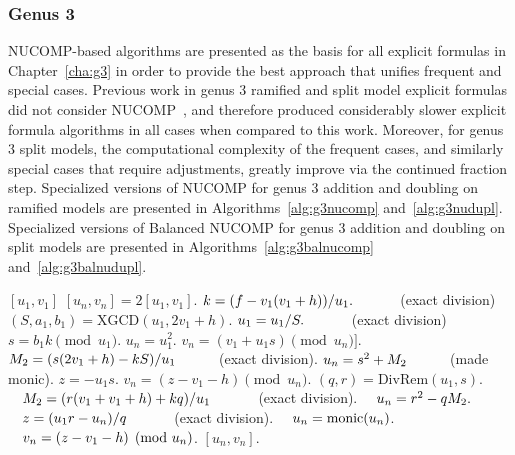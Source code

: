 \newpage


\subsubsection{Genus 3}
NUCOMP-based algorithms are presented as the basis for all explicit formulas in
Chapter~\ref{cha:g3} in order to provide the best approach that unifies frequent
and special cases. Previous work in genus 3 ramified and split model explicit
formulas did not consider
NUCOMP~\cite{fan_g3_2006,rad2019jacobian,Sutherland_g3_2019}, and therefore
produced considerably slower explicit formula algorithms in all cases when
compared to this work. Moreover, for genus 3 split models, the computational
complexity of the frequent cases, and similarly special cases that require
adjustments, greatly improve via the continued fraction step. Specialized
versions of NUCOMP for genus 3 addition and doubling on ramified models are
presented in Algorithms~\ref{alg:g3nucomp} and~\ref{alg:g3nudupl}. Specialized
versions of Balanced NUCOMP for genus 3 addition and doubling on split models
are presented in Algorithms~\ref{alg:g3balnucomp} and~\ref{alg:g3balnudupl}.


\begin{algorithm}[htbp]
\caption{Genus 3 Ramified Model Double}
\label{alg:g3nudupl}
\begin{algorithmic}[1]
\Require $[u_1,v_1]$ 
\Ensure $[u_n,v_n] = 2[u_1,v_1]$.
\vspace{5pt}
\State $k = (f - v_1(v_1 + h))/u_1. \quad\quad\quad$ (exact division)
\State $(S,a_1,b_1) = \mathrm{XGCD}(u_1,2v_1 + h)$.
    \State $u_1 = u_1/S. \quad\quad\quad$ (exact division)
\EndIf
\State $s = b_1k \pmod{u_1}$.
    \State $u_n = u_1^2$.
    \State $v_n = (v_1 + u_1s) \pmod{u_n}]$.
    \State $M_2 = (s(2v_1 + h) - kS)/u_1 \quad\quad\quad $(exact division).
    \State $u_n = s^2 + M_2 \quad\quad\quad$(made monic).
    \State $z = -u_1s$.
    \State $v_n = (z - v_1 - h) \pmod{u_n}$.
\Else \hspace{2pt} 
    \State $(q,r) = \mathrm{DivRem}(u_1,s)$.
    \State $\quad M_2 = (r(v_1 + v_1 + h) + kq)/u_1 \quad\quad\quad$ (exact division).
    \State $\quad u_n = r^2 - qM_2.$
    \State $\quad z = (u_1r - u_n)/q \quad\quad\quad$ (exact division).
    \State $\quad u_n = \mathrm{monic}(u_n)$.
    \State $\quad v_n = (z - v_1 - h) \pmod{u_n}$.
\EndIf
\State \Return $[u_n,v_n]$.
\end{algorithmic}
\end{algorithm}


